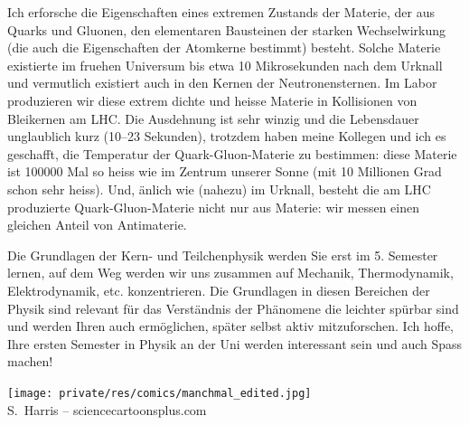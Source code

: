 \begin{multicols}{2}
Ich erforsche die Eigenschaften eines extremen Zustands der Materie, der aus Quarks und Gluonen, den elementaren Bausteinen der starken Wechselwirkung (die auch die Eigenschaften der Atomkerne bestimmt) besteht. Solche Materie existierte im fruehen Universum bis etwa 10 Mikrosekunden nach dem Urknall und vermutlich existiert auch in den Kernen der Neutronensternen. Im Labor produzieren wir diese extrem dichte und heisse Materie in Kollisionen von Bleikernen am LHC. Die Ausdehnung ist sehr winzig und die Lebensdauer unglaublich kurz (10--23 Sekunden), trotzdem haben meine Kollegen und ich es geschafft, die Temperatur der Quark-Gluon-Materie zu bestimmen: diese Materie ist 100000 Mal so heiss wie im
Zentrum unserer Sonne (mit 10 Millionen Grad schon sehr heiss). Und, änlich wie (nahezu) im Urknall, besteht die am LHC produzierte Quark-Gluon-Materie nicht nur aus Materie: wir messen einen gleichen Anteil von Antimaterie.

Die Grundlagen der Kern- und Teilchenphysik werden Sie erst im 5. Semester lernen, auf dem Weg werden wir uns zusammen auf Mechanik, Thermodynamik, Elektrodynamik, etc. konzentrieren. Die Grundlagen in diesen Bereichen der Physik sind relevant für das Verständnis der Phänomene die leichter spürbar sind und werden Ihren auch ermöglichen, später selbst aktiv mitzuforschen. Ich hoffe, Ihre ersten Semester in Physik an der Uni werden interessant sein und auch Spass machen!

\begin{center}
\texttt{[image: private/res/comics/manchmal\_edited.jpg]}\\
{\footnotesize 
S.~Harris – sciencecartoonsplus.com}
\end{center}

\end{multicols}

\newpage

